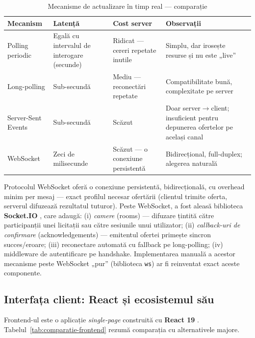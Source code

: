 \begin{table}[!ht]\small\linespread{1}
\centering
\caption{Mecanisme de actualizare în timp real --- comparație}
\label{tab:comparatie-realtime}
\begin{tabular}{>{\raggedright\arraybackslash}p{3.4cm} >{\raggedright\arraybackslash}p{3.4cm} >{\raggedright\arraybackslash}p{3.4cm} >{\raggedright\arraybackslash}p{3.6cm}}
\toprule
\textbf{Mecanism} & \textbf{Latență} & \textbf{Cost server} & \textbf{Observații} \\
\midrule
Polling periodic & Egală cu intervalul de interogare (secunde) & Ridicat --- cereri repetate inutile & Simplu, dar irosește resurse și nu este „live'' \\
Long-polling & Sub-secundă & Mediu --- reconectări repetate & Compatibilitate bună, complexitate pe server \\
Server-Sent Events & Sub-secundă & Scăzut & Doar server$\to$client; insuficient pentru depunerea ofertelor pe același canal \\
WebSocket \cite{rfc6455} & Zeci de milisecunde & Scăzut --- o conexiune persistentă & Bidirecțional, full-duplex; alegerea naturală \\
\bottomrule
\end{tabular}
\end{table}

Protocolul WebSocket \cite{rfc6455} oferă o conexiune persistentă, bidirecțională, cu overhead minim per mesaj --- exact profilul necesar ofertării (clientul trimite oferta, serverul difuzează rezultatul tuturor). Peste WebSocket, a fost aleasă biblioteca \textbf{Socket.IO} \cite{socketiodocs}, care adaugă: (i) \textit{camere} (rooms) --- difuzare țintită către participanții unei licitații sau către sesiunile unui utilizator; (ii) \textit{callback-uri de confirmare} (acknowledgements) --- emitentul ofertei primește sincron succes/eroare; (iii) reconectare automată cu fallback pe long-polling; (iv) middleware de autentificare pe handshake. Implementarea manuală a acestor mecanisme peste WebSocket „pur'' (biblioteca \texttt{ws}) ar fi reinventat exact aceste componente.

\subsection{Interfața client: React și ecosistemul său}

Frontend-ul este o aplicație \textit{single-page} \cite{mikowski2013} construită cu \textbf{React 19} \cite{reactdocs}. Tabelul~\ref{tab:comparatie-frontend} rezumă comparația cu alternativele majore.

